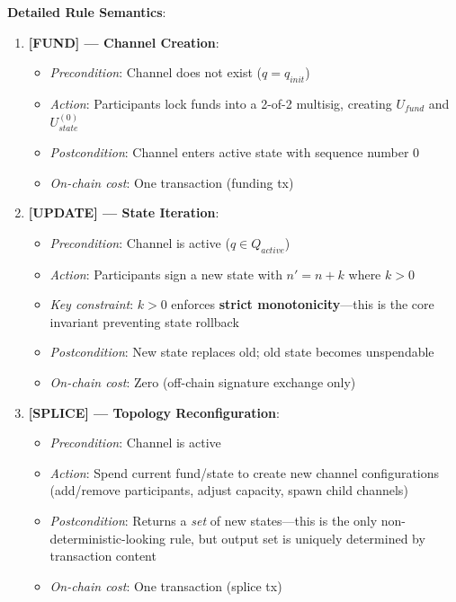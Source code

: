 \textbf{Detailed Rule Semantics}:

\begin{enumerate}
    \item \textbf{[FUND] --- Channel Creation}:
    \begin{itemize}
        \item \textit{Precondition}: Channel does not exist ($q = q_{init}$)
        \item \textit{Action}: Participants lock funds into a 2-of-2 multisig, creating $U_{fund}$ and $U_{state}^{(0)}$
        \item \textit{Postcondition}: Channel enters active state with sequence number 0
        \item \textit{On-chain cost}: One transaction (funding tx)
    \end{itemize}
    
    \item \textbf{[UPDATE] --- State Iteration}:
    \begin{itemize}
        \item \textit{Precondition}: Channel is active ($q \in Q_{active}$)
        \item \textit{Action}: Participants sign a new state with $n' = n + k$ where $k > 0$
        \item \textit{Key constraint}: $k > 0$ enforces \textbf{strict monotonicity}---this is the core invariant preventing state rollback
        \item \textit{Postcondition}: New state replaces old; old state becomes unspendable
        \item \textit{On-chain cost}: Zero (off-chain signature exchange only)
    \end{itemize}
    
    \item \textbf{[SPLICE] --- Topology Reconfiguration}:
    \begin{itemize}
        \item \textit{Precondition}: Channel is active
        \item \textit{Action}: Spend current fund/state to create new channel configurations (add/remove participants, adjust capacity, spawn child channels)
        \item \textit{Postcondition}: Returns a \textit{set} of new states---this is the only non-deterministic-looking rule, but output set is uniquely determined by transaction content
        \item \textit{On-chain cost}: One transaction (splice tx)
    \end{itemize}
    

\end{enumerate}
